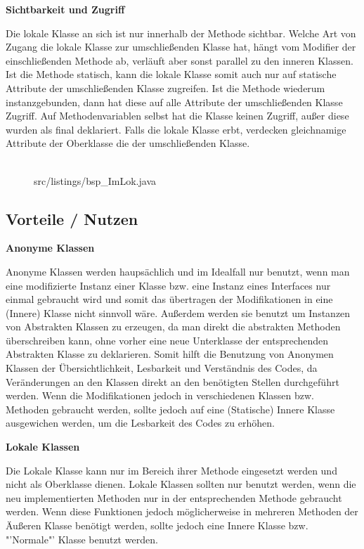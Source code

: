 {\bf Sichtbarkeit und Zugriff}

Die lokale Klasse an sich ist nur innerhalb der Methode sichtbar. Welche Art von Zugang die lokale Klasse zur umschließenden Klasse hat, hängt vom Modifier der einschließenden Methode ab, verläuft aber sonst parallel zu den inneren Klassen.
Ist die Methode statisch, kann die lokale Klasse somit auch nur auf statische Attribute der umschließenden Klasse zugreifen. Ist die Methode wiederum instanzgebunden, dann hat diese auf alle Attribute der umschließenden Klasse Zugriff.
Auf Methodenvariablen selbst hat die Klasse keinen Zugriff, außer diese wurden als final deklariert. Falls die lokale Klasse erbt, verdecken gleichnamige Attribute der Oberklasse die der umschließenden Klasse.
\\
\\
\begin{figure}[ht]
\lstset{language=Java}
 {src/listings/bsp_ImLok.java}
\end{figure}

\newpage
\newpage

\subsection{Vorteile / Nutzen}

{\bf Anonyme Klassen}

Anonyme Klassen werden haupsächlich und im Idealfall nur benutzt, wenn man eine modifizierte Instanz einer Klasse bzw. eine Instanz eines Interfaces nur einmal gebraucht wird und somit das übertragen der Modifikationen in eine (Innere) Klasse nicht sinnvoll wäre.
Außerdem werden sie benutzt um Instanzen von Abstrakten Klassen zu erzeugen, da man direkt die abstrakten Methoden überschreiben kann, ohne vorher eine neue Unterklasse der entsprechenden Abstrakten Klasse zu deklarieren.
Somit hilft die Benutzung von Anonymen Klassen der Übersichtlichkeit, Lesbarkeit und Verständnis des Codes, da Veränderungen an den Klassen direkt an den benötigten Stellen durchgeführt werden.
Wenn die Modifikationen jedoch in verschiedenen Klassen bzw. Methoden gebraucht werden, sollte jedoch auf eine (Statische) Innere Klasse ausgewichen werden, um die Lesbarkeit des Codes zu erhöhen.

{\bf Lokale Klassen}

Die Lokale Klasse kann nur im Bereich ihrer Methode eingesetzt werden und nicht als Oberklasse dienen.
Lokale Klassen sollten nur benutzt werden, wenn die neu implementierten Methoden nur in der entsprechenden Methode gebraucht werden.
Wenn diese Funktionen jedoch möglicherweise in mehreren Methoden der Äußeren Klasse benötigt werden, sollte jedoch eine Innere Klasse bzw. "'Normale"' Klasse benutzt werden.

